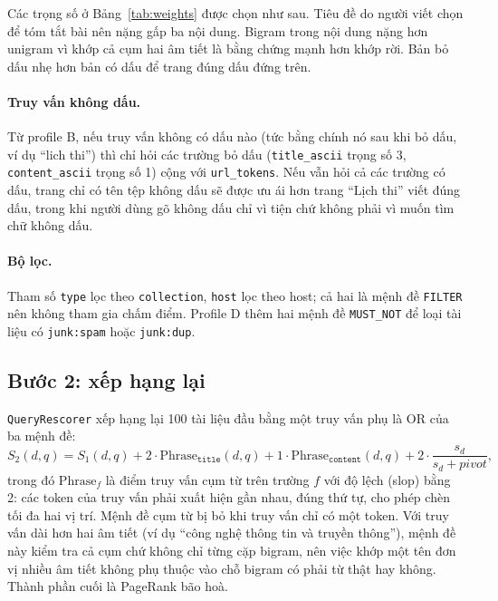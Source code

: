 \documentclass[12pt,a4paper]{report}
\begin{document}
Các trọng số ở Bảng~\ref{tab:weights} được chọn như sau. Tiêu đề do người viết chọn để tóm tắt bài nên nặng gấp ba nội
dung. Bigram trong nội dung nặng hơn unigram vì khớp cả cụm hai âm tiết là bằng chứng mạnh hơn khớp rời. Bản bỏ dấu nhẹ
hơn bản có dấu để trang đúng dấu đứng trên.

\paragraph{Truy vấn không dấu.} Từ profile B, nếu truy vấn không có dấu nào (tức bằng chính nó sau khi bỏ dấu, ví dụ
``lich thi'') thì chỉ hỏi các trường bỏ dấu (\texttt{title\_\allowbreak{}ascii} trọng số 3, \texttt{content\_\allowbreak{}ascii} trọng số 1) cộng
với \texttt{url\_\allowbreak{}tokens}. Nếu vẫn hỏi cả các trường có dấu, trang chỉ có tên tệp không dấu sẽ được ưu ái hơn trang
``Lịch thi'' viết đúng dấu, trong khi người dùng gõ không dấu chỉ vì tiện chứ không phải vì muốn tìm chữ không dấu.

\paragraph{Bộ lọc.} Tham số \texttt{type} lọc theo \texttt{collection}, \texttt{host} lọc theo host; cả hai là mệnh đề
\texttt{FILTER} nên không tham gia chấm điểm. Profile D thêm hai mệnh đề \texttt{MUST\_\allowbreak{}NOT} để loại tài liệu có
\texttt{junk:spam} hoặc \texttt{junk:dup}.

\subsection{Bước 2: xếp hạng lại}

\texttt{QueryRescorer} xếp hạng lại 100 tài liệu đầu bằng một truy vấn phụ là OR của ba mệnh đề:
\begin{equation}
S_2(d, q) = S_1(d, q) + 2\cdot \mathrm{Phrase}_{\texttt{title}}(d, q) + 1\cdot \mathrm{Phrase}_{\texttt{content}}(d, q)
  + 2\cdot\frac{s_d}{s_d + \mathit{pivot}},
\end{equation}
trong đó $\mathrm{Phrase}_f$ là điểm truy vấn cụm từ trên trường $f$ với độ lệch (slop) bằng 2: các token của truy vấn
phải xuất hiện gần nhau, đúng thứ tự, cho phép chèn tối đa hai vị trí. Mệnh đề cụm từ bị bỏ khi truy vấn chỉ có một
token. Với truy vấn dài hơn hai âm tiết (ví dụ ``công nghệ thông tin và truyền thông''), mệnh đề này kiểm tra cả cụm chứ không chỉ từng cặp bigram, nên việc khớp một tên đơn vị nhiều âm tiết không phụ thuộc vào chỗ bigram có phải từ thật hay không. Thành phần cuối là PageRank bão hoà.
\end{document}
